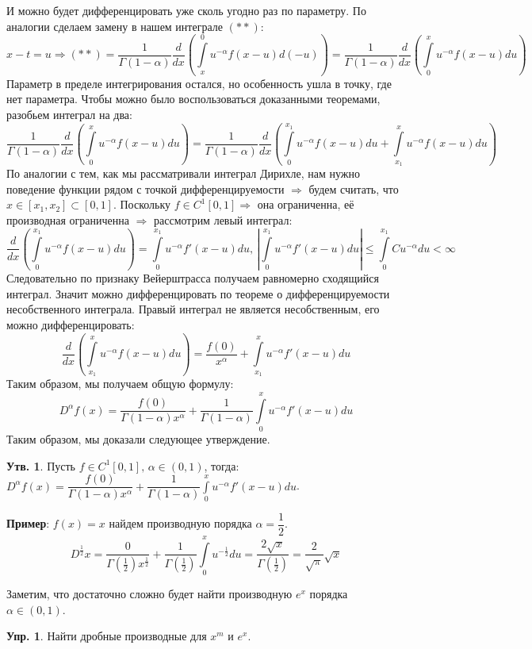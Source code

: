 \documentclass[12pt]{article}
\theoremstyle{definition}
\newtheorem{prop}{Утв.}
\newtheorem{exrc}{Упр.}
\newcommand{\ddint}[2]{\displaystyle\int\limits_{#1}^{#2}}
\begin{document}
И можно будет дифференцировать уже сколь угодно раз по параметру. По аналогии сделаем замену в нашем интеграле $(**)$:
$$
	x - t = u \Rightarrow (**) = \dfrac{1}{\Gamma(1 - \alpha)}\dfrac{d}{dx}\left(\ddint{x}{0}u^{-\alpha}f(x - u)d(-u)\right) = \dfrac{1}{\Gamma(1 - \alpha)}\dfrac{d}{dx}\left(\ddint{0}{x}u^{-\alpha}f(x - u)du\right)
$$
Параметр в пределе интегрирования остался, но особенность ушла в точку, где нет параметра. Чтобы можно было воспользоваться доказанными теоремами, разобьем интеграл на два:
$$
	\dfrac{1}{\Gamma(1 - \alpha)}\dfrac{d}{dx}\left(\ddint{0}{x}u^{-\alpha}f(x - u)du\right) = \dfrac{1}{\Gamma(1 - \alpha)}\dfrac{d}{dx}\left(\ddint{0}{x_1}u^{-\alpha}f(x - u)du + \ddint{x_1}{x}u^{-\alpha}f(x - u)du\right)
$$
По аналогии с тем, как мы рассматривали интеграл Дирихле, нам нужно поведение функции рядом с точкой дифференцируемости $\Rightarrow$ будем считать, что $x \in [x_1,x_2]\subset[0,1]$. Поскольку $f \in C^1[0,1] \Rightarrow$ она ограниченна, её производная ограниченна $\Rightarrow$ рассмотрим левый интеграл:
$$
	\dfrac{d}{dx}\left(\ddint{0}{x_1}u^{-\alpha}f(x - u)du\right) = \ddint{0}{x_1}u^{-\alpha}f'(x - u)du, \, \left|\ddint{0}{x_1}u^{-\alpha}f'(x - u)du\right|\leq \ddint{0}{x_1}Cu^{-\alpha}du < \infty
$$
Следовательно по признаку Вейерштрасса получаем равномерно сходящийся интеграл. Значит можно дифференцировать по теореме о дифференцируемости несобственного интеграла. Правый интеграл не является несобственным, его можно дифференцировать:
$$
		\dfrac{d}{dx}\left(\ddint{x_1}{x}u^{-\alpha}f(x - u)du\right) = \dfrac{f(0)}{x^{\alpha}} + \ddint{x_1}{x}u^{-\alpha}f'(x - u)du 
$$
Таким образом, мы получаем общую формулу:
$$
	D^{\alpha}f(x) = \dfrac{f(0)}{\Gamma(1-\alpha) x^{\alpha}} +\dfrac{1}{\Gamma(1- \alpha)} \ddint{0}{x}u^{-\alpha}f'(x-u)du
$$
Таким образом, мы доказали следующее утверждение.
\begin{prop}
	Пусть $f \in C^1[0,1], \, \alpha \in (0,1)$, тогда: $	D^{\alpha}f(x) = \dfrac{f(0)}{\Gamma(1-\alpha) x^{\alpha}} +\dfrac{1}{\Gamma(1- \alpha)} \ddint{0}{x}u^{-\alpha}f'(x-u)du$.
\end{prop}

\textbf{Пример}: $f(x) = x$ найдем производную порядка $\alpha = \dfrac{1}{2}$.
$$
	D^{\frac{1}{2}}x = \dfrac{0}{\Gamma\left(\frac{1}{2}\right)x^{\frac{1}{2}}} + \dfrac{1}{\Gamma\left(\frac{1}{2}\right)}\ddint{0}{x}u^{-\frac{1}{2}}du = \dfrac{2 \sqrt{x}}{\Gamma\left(\frac{1}{2}\right)} = \dfrac{2}{\sqrt{\pi}}\sqrt{x}
$$

Заметим, что достаточно сложно будет найти производную $e^x$ порядка $\alpha \in (0,1)$.
\begin{exrc}
	Найти дробные производные для $x^m$ и $e^x$.
\end{exrc}
\end{document}
